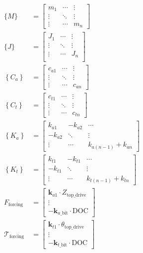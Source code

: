 \begin{align}
	\{M\} &= \left[\begin{array}{ccc}
				m_1 & \cdots & \vdots \\
				\vdots & \ddots & \vdots \\
				\vdots & \cdots & m_n
				\end{array}\right] \\
	\{J\} &= \left[\begin{array}{ccc}
			J_1 & \cdots & \vdots \\
			\vdots & \ddots & \vdots \\
			\vdots & \cdots & J_n  \\
  			\end{array}\right] \\
	\left\{C_a\right\} &= \left[\begin{array}{ccc}
							c_{a 1} & \cdots & \vdots \\
							\vdots & \ddots & \vdots \\
							\vdots & \cdots & c_{a n}
							\end{array}\right] \\
	\left\{C_t\right\} &= \left[\begin{array}{ccc}
							c_{t 1} & \cdots & \vdots \\
							\vdots & \ddots & \vdots \\
							\vdots & \cdots & c_{t n}
							\end{array}\right] \\
 	\left\{K_a\right\} &= \left[\begin{array}{ccc}
							k_{a 1} & -k_{a 2} & \cdots \\
							-k_{a 2} & \ddots & \vdots \\
							\vdots & \cdots & k_{a(n-1)}+k_{a n}
							\end{array}\right] \\
	\left\{K_t\right\} &= \left[\begin{array}{ccc}
							k_{t 1} & -k_{t 1} & \cdots \\
							-k_{t 1} & \ddots & \vdots \\
							\vdots & \cdots & k_{t(n-1)}+k_{t n}
							\end{array}\right] \\
  	F_{\text {forcing }} &= \left[\begin{array}{c}
							\boldsymbol{k}_{a 1} \cdot Z_{\text {top\_drive}} \\
							\vdots \\
							-\boldsymbol{k}_{a\_\text{bit}} \cdot \text {DOC}
							\end{array}\right] \\
	\mathcal{T}_{\text {forcing }} &= \left[\begin{array}{c}
							\boldsymbol{k}_{t 1} \cdot \theta_{\text {top\_drive}} \\
							\vdots \\
							-\boldsymbol{k}_{t\_\text{bit}} \cdot \text {DOC}
							\end{array}\right]
	\label{eq:emmatrixform}
\end{align}


